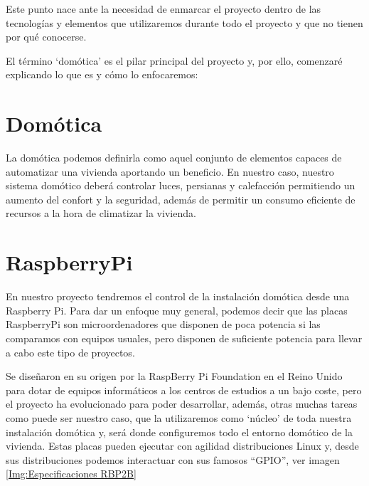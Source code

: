 
Este punto nace ante la necesidad de enmarcar el proyecto dentro de las tecnologías y elementos que utilizaremos durante todo el proyecto y que no tienen por qué conocerse.

El término ‘domótica’ es el pilar principal del proyecto y, por ello, comenzaré explicando lo que es y cómo lo enfocaremos:

\section{Domótica}
La domótica podemos definirla como aquel conjunto de elementos capaces de automatizar una vivienda aportando un beneficio.
En nuestro caso, nuestro sistema domótico deberá controlar luces, persianas y calefacción permitiendo un aumento del confort y la seguridad, además de permitir un consumo eficiente de recursos a la hora de climatizar la vivienda.

\section{RaspberryPi}
En nuestro proyecto tendremos el control de la instalación domótica desde una Raspberry Pi. 
Para dar un enfoque muy general, podemos decir que las placas RaspberryPi son microordenadores que disponen de poca potencia si las comparamos con equipos usuales, pero disponen de suficiente potencia para llevar a cabo este tipo de proyectos.

Se diseñaron en su origen por la RaspBerry Pi Foundation en el Reino Unido para dotar de equipos informáticos a los centros de estudios a un bajo coste, pero el proyecto ha evolucionado para poder desarrollar, además, otras muchas tareas como puede ser nuestro caso, que la utilizaremos como ‘núcleo’ de toda nuestra instalación domótica y, será donde configuremos todo el entorno domótico de la vivienda.
Estas placas pueden ejecutar con agilidad distribuciones Linux y, desde sus distribuciones podemos interactuar con sus famosos “GPIO”, ver imagen \ref{Img:Especificaciones RBP2B}

